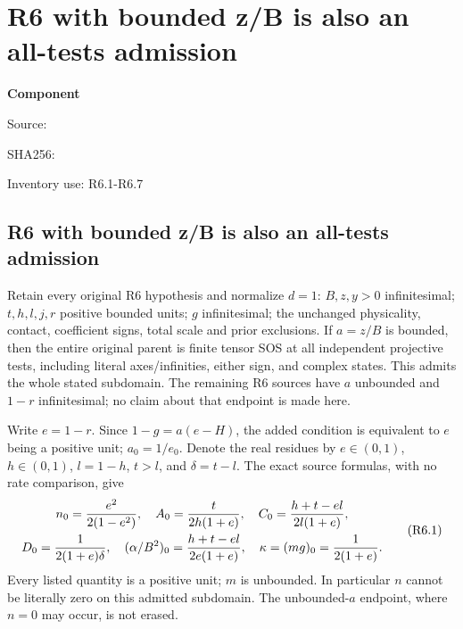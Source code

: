 \chapter{R6 with bounded z/B is also an all-tests admission}
\label{component:pd5fa361b4623}
\noindent\textbf{Component }\par
{\small\noindent Source: \par}
{\small\noindent SHA256: \par}
{\small\noindent Inventory use: R6.1-R6.7\par}
\medskip
\section{R6 with bounded z/B is also an all-tests admission}
\label{pd5fa361b4623:sec:r17-r6-bounded-a}
\begin{theorem}
Retain every original R6 hypothesis and normalize $d=1$: $B,z,y>0$
infinitesimal; $t,h,l,j,r$ positive bounded units; $g$ infinitesimal;
the unchanged physicality, contact, coefficient signs, total scale and
prior exclusions. If $a=z/B$ is bounded, then the entire original
parent is finite tensor SOS at all independent projective tests,
including literal axes/infinities, either sign, and complex states.
This admits the whole stated subdomain. The remaining R6 sources have
$a$ unbounded and $1-r$ infinitesimal; no claim about that endpoint is
made here.
\end{theorem}

Write $e=1-r$. Since $1-g=a(e-H)$, the added condition is equivalent
to $e$ being a positive unit; $a_0=1/e_0$. Denote the real residues
by $e\in(0,1)$, $h\in(0,1)$, $l=1-h$, $t>l$, and $\delta=t-l$.
The exact source formulas, with no rate comparison, give
\[
\begin{gathered}
 n_0={e^2\over2(1-e^2)},\quad
 A_0={t\over2h(1+e)},\quad
 C_0={h+t-el\over2l(1+e)},\\
 D_0={1\over2(1+e)\delta},\quad
 (\alpha/B^2)_0={h+t-el\over2e(1+e)},\quad
 \kappa=(mg)_0={1\over2(1+e)}.
\end{gathered}                       \tag{R6.1}
\]
Every listed quantity is a positive unit; $m$ is unbounded. In
particular $n$ cannot be literally zero on this admitted subdomain.
The unbounded-$a$ endpoint, where $n=0$ may occur, is not erased.

